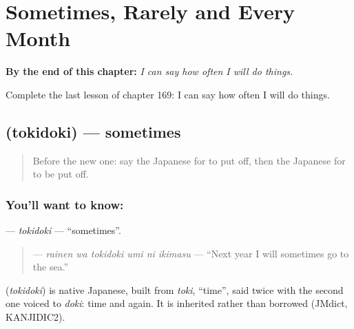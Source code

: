 
\chapter{Sometimes, Rarely and Every Month}
\label{ch:ja-sometimes-rarely-and-every-month}

\begin{chapteropening}
\textbf{By the end of this chapter:} \emph{I can say how often I will do things.}

Complete the last lesson of chapter 169: I can say how often I will do things.
\end{chapteropening}

\section[\texorpdfstring{\ja{ときどき} (tokidoki)}{ときどき (tokidoki)}]{ (tokidoki) — sometimes}

\label{lesson:JA-C169-tokidoki}



\begin{quote}
Before the new one: say the Japanese for to put off, then the Japanese for to be put off.
\end{quote}

\subsection*{You'll want to know: }
\textbf{} — \emph{tokidoki} — \textquotedblleft{}sometimes\textquotedblright{}.

\begin{quote}
\textbf{   } — \emph{rainen wa tokidoki umi ni ikimasu} — \textquotedblleft{}Next year I will sometimes go to the sea.\textquotedblright{}
\end{quote}

\begin{cousinweb}
\textbf{} (\emph{tokidoki}) is native Japanese, built from \emph{toki}, \textquotedblleft{}time\textquotedblright{}, said twice with the second one voiced to \emph{doki}: time and again. It is inherited rather than borrowed (JMdict, KANJIDIC2).
\end{cousinweb}

